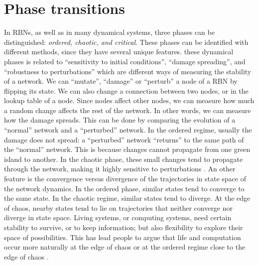 \section{Phase transitions}
In RBNs, as well as in many dynamical systems, three
phases can be distinguished: \emph{ordered, chaotic, and critical}.
These phases can be identified with different methods, since
they have several unique features.
these dynamical phases is related to
“sensitivity to initial conditions”, “damage spreading”, and
“robustness to perturbations” which are different ways of
measuring the stability of a network. We can “mutate”,
“damage” or “perturb” a node of a RBN by flipping its state.
We can also change a connection between two nodes, or in
the lookup table of a node. Since nodes affect other nodes,
we can measure how much a random change affects the rest
of the network. In other words, we can measure how the
damage spreads. This can be done by comparing the evolution of a “normal” network and a “perturbed” network. In
the ordered regime, usually the damage does not spread: a
“perturbed” network “returns” to the same path of the “normal” network. This is because changes cannot propagate
from one green island to another. In the chaotic phase, these
small changes tend to propagate through the network, making it highly sensitive to perturbations \cite{K49}.
An other feature is the convergence versus divergence of the
trajectories in state space of the network dynamics. In the ordered phase, similar states tend to converge to the same state.
In the chaotic regime, similar states tend to diverge. At the
edge of chaos, nearby states tend to lie on trajectories that
neither converge nor diverge in state space.
Living systems, or computing systems, need certain stability to survive, or to keep information; but also flexibility
to explore their space of possibilities. This has lead people
to argue that life and computation occur more naturally at
the edge of chaos or at the ordered regime
close to the edge of chaos \cite{K6}\cite{K49}.
